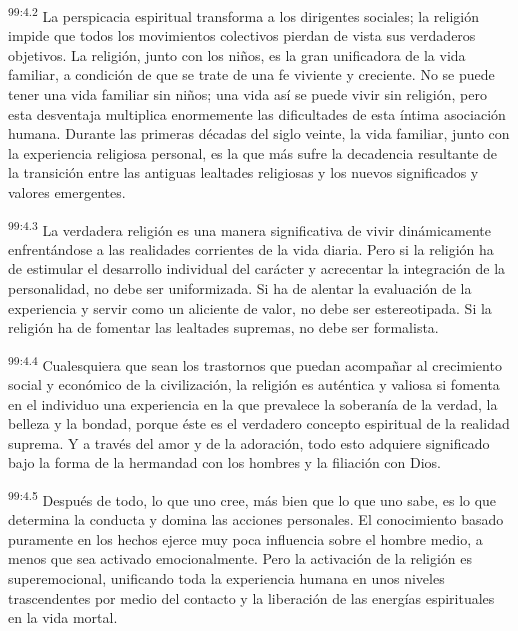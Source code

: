 \par
\textsuperscript{99:4.2} La perspicacia espiritual transforma a los dirigentes sociales; la religión impide que todos los movimientos colectivos pierdan de vista sus verdaderos objetivos. La religión, junto con los niños, es la gran unificadora de la vida familiar, a condición de que se trate de una fe viviente y creciente. No se puede tener una vida familiar sin niños; una vida así se puede vivir sin religión, pero esta desventaja multiplica enormemente las dificultades de esta íntima asociación humana. Durante las primeras décadas del siglo veinte, la vida familiar, junto con la experiencia religiosa personal, es la que más sufre la decadencia resultante de la transición entre las antiguas lealtades religiosas y los nuevos significados y valores emergentes.

\par
\textsuperscript{99:4.3} La verdadera religión es una manera significativa de vivir dinámicamente enfrentándose a las realidades corrientes de la vida diaria. Pero si la religión ha de estimular el desarrollo individual del carácter y acrecentar la integración de la personalidad, no debe ser uniformizada. Si ha de alentar la evaluación de la experiencia y servir como un aliciente de valor, no debe ser estereotipada. Si la religión ha de fomentar las lealtades supremas, no debe ser formalista.

\par
\textsuperscript{99:4.4} Cualesquiera que sean los trastornos que puedan acompañar al crecimiento social y económico de la civilización, la religión es auténtica y valiosa si fomenta en el individuo una experiencia en la que prevalece la soberanía de la verdad, la belleza y la bondad, porque éste es el verdadero concepto espiritual de la realidad suprema. Y a través del amor y de la adoración, todo esto adquiere significado bajo la forma de la hermandad con los hombres y la filiación con Dios.

\par
\textsuperscript{99:4.5} Después de todo, lo que uno cree, más bien que lo que uno sabe, es lo que determina la conducta y domina las acciones personales. El conocimiento basado puramente en los hechos ejerce muy poca influencia sobre el hombre medio, a menos que sea activado emocionalmente. Pero la activación de la religión es superemocional, unificando toda la experiencia humana en unos niveles trascendentes por medio del contacto y la liberación de las energías espirituales en la vida mortal.

